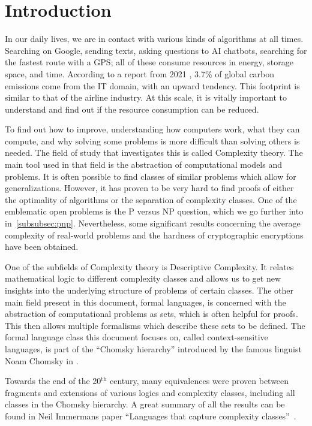 \chapter{Introduction}\label{ch:intro}

In our daily lives, we are in contact with various kinds of algorithms at all times.
Searching on Google, sending texts, asking questions to \acs{AI} chatbots, searching for the fastest route with a \acs{GPS}; all of these consume resources in energy, storage space, and time.
According to a report from 2021 \cite{webFootprint}, 3.7\% of global carbon emissions come from the \acs{IT} domain, with an upward tendency.
This footprint is similar to that of the airline industry.
At this scale, it is vitally important to understand and find out if the resource consumption can be reduced.

To find out how to improve, understanding how computers work, what they can compute, and why solving some problems is more difficult than solving others is needed.
The field of study that investigates this is called Complexity theory.
The main tool used in that field is the abstraction of computational models and problems.
It is often possible to find classes of similar problems which allow for generalizations.
However, it has proven to be very hard to find proofs of either the optimality of algorithms or the separation of complexity classes.
One of the emblematic open problems is the \acs{P} versus \acs{NP} question, which we go further into in~\cref{subsubsec:pnp}.
Nevertheless, some significant results concerning the average complexity of real-world problems and the hardness of cryptographic encryptions have been obtained.

One of the subfields of Complexity theory is Descriptive Complexity.
It relates mathematical logic to different complexity classes and allows us to get new insights into the underlying structure of problems of certain classes.
The other main field present in this document, formal languages, is concerned with the abstraction of computational problems as sets, which is often helpful for proofs.
This then allows multiple formalisms which describe these sets to be defined.
The formal language class this document focuses on, called context-sensitive languages, is part of the ``Chomsky hierarchy'' introduced by the famous linguist Noam Chomsky in \cite{Chomsky1959}.

Towards the end of the 20$^{\text{th}}$ century, many equivalences were proven between fragments and extensions of various logics and complexity classes, including all classes in the Chomsky hierarchy.
A great summary of all the results can be found in Neil Immermans paper ``Languages that capture complexity classes''~\cite{Immerman1987}.

